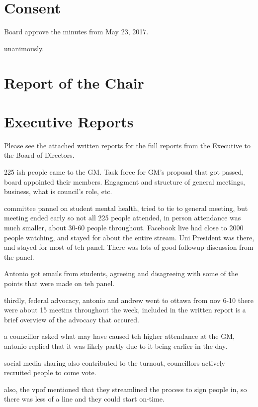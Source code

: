 \section*{Consent}

\begin{motion}
    \birt Board approve the minutes from May 23, 2017.
    \movers{\brian}{\abdullah}

    \carries unanimously.
\end{motion}

\section*{Report of the Chair}

\section*{Executive Reports}

Please see the attached written reports for the full reports from the Executive
to the Board of Directors. 

\begin{information}
    225 ish people came to the GM. Task force  for GM's proposal that got 
    passed, board appointed their members. Engagment and structure of 
    general meetings, business, what is council's role, etc. 

    committee pannel on student mental health, tried to tie to general 
    meeting, but meeting ended early so not all 225 people attended, in
    person attendance was much smaller, about 30-60 people throughout. 
    Facebook live had close to 2000 people watching, and stayed for about
    the entire stream. Uni President was there, and stayed for most of teh
    panel. There was lots of good followup discussion from the panel.

    Antonio got emails from students, agreeing and disagreeing with some of the
    points that were made on teh panel. 

    thirdly, federal advocacy, antonio and andrew went to ottawa from nov 6-10 
    there were about 15 meetins throughout the week, included in the written
    report is a brief overview of the advocacy that occured. 


    a councillor asked what may have caused teh higher attendance at the GM,
    antonio replied that it was likely partly due to it being earlier in 
    the day. 

    social media sharing also contributed to the turnout, councillors actively
    recruited people to come vote.

    also, the vpof mentioned that they streamlined the process to sign people
    in, so there was less of a line and they could start on-time.

\end{information}

